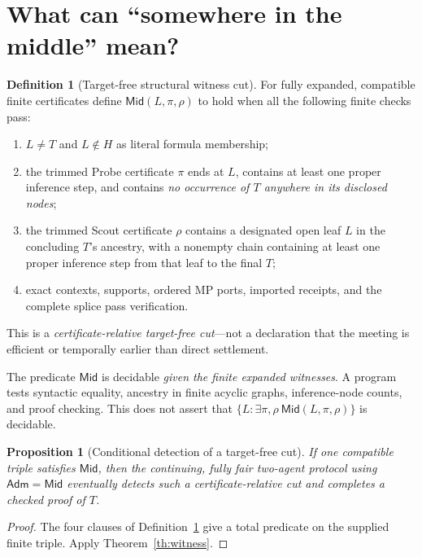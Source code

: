 \documentclass[11pt,letterpaper]{article}
\newtheorem{proposition}[theorem]{Proposition}
\theoremstyle{definition}
\newtheorem{definition}[theorem]{Definition}
\newcommand{\Adm}{\mathsf{Adm}}
\newcommand{\Mid}{\mathsf{Mid}}
\begin{document}
\section{What can ``somewhere in the middle'' mean?}
\begin{definition}[Target-free structural witness cut]\label{def:mid}
For fully expanded, compatible finite certificates define
$\Mid(L,\pi,\rho)$ to hold when all the following finite checks pass:
\begin{enumerate}[label=(\roman*)]
\item $L\neq T$ and $L\notin H$ as literal formula membership;
\item the trimmed Probe certificate $\pi$ ends at $L$, contains at least
 one proper inference step, and contains \emph{no occurrence of $T$ anywhere
 in its disclosed nodes};
\item the trimmed Scout certificate $\rho$ contains a designated open leaf
 $L$ in the concluding $T$'s ancestry, with a nonempty chain containing
 at least one proper inference step from that leaf to the final $T$;
\item exact contexts, supports, ordered MP ports, imported receipts, and
 the complete splice pass verification.
\end{enumerate}
This is a \emph{certificate-relative target-free cut}---not a declaration
that the meeting is efficient or temporally earlier than direct settlement.
\end{definition}

The predicate $\Mid$ is decidable \emph{given the finite expanded witnesses}.
A program tests syntactic equality, ancestry in finite acyclic graphs,
inference-node counts, and proof checking. This does not assert that
$\{L:\exists\pi,\rho\ \Mid(L,\pi,\rho)\}$ is decidable.

\begin{proposition}[Conditional detection of a target-free cut]\label{prop:mid}
If one compatible triple satisfies $\Mid$, then the continuing, fully
fair two-agent protocol using $\Adm=\Mid$ eventually detects such a
certificate-relative cut and completes a checked proof of $T$.
\end{proposition}
\begin{proof}
The four clauses of Definition~\ref{def:mid} give a total predicate on
the supplied finite triple. Apply Theorem~\ref{th:witness}.
\end{proof}
\end{document}

